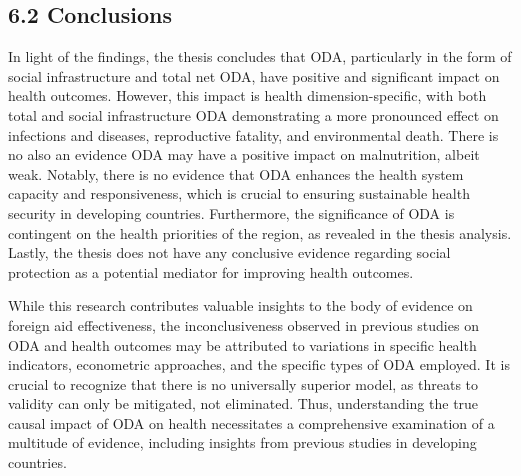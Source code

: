 \subsection*{6.2 Conclusions}

In light of the findings, the thesis concludes that ODA, particularly in the form of social infrastructure and total net ODA, have positive and significant impact on health outcomes. However, this impact is health dimension-specific, with both total and social infrastructure ODA demonstrating a more pronounced effect on infections and diseases, reproductive fatality, and environmental death. There is no also an evidence ODA may have a positive impact on malnutrition, albeit weak. Notably, there is no evidence that ODA enhances the health system capacity and responsiveness, which is crucial to ensuring sustainable health security in developing countries. Furthermore, the significance of ODA is contingent on the health priorities of the region, as revealed in the thesis analysis. Lastly, the thesis does not have any conclusive evidence regarding social protection as a potential mediator for improving health outcomes. 


While this research contributes valuable insights to the body of evidence on foreign aid effectiveness, the inconclusiveness observed in previous studies on ODA and health outcomes may be attributed to variations in specific health indicators, econometric approaches, and the specific types of ODA employed. It is crucial to recognize that there is no universally superior model, as threats to validity can only be mitigated, not eliminated. Thus, understanding the true causal impact of ODA on health necessitates a comprehensive examination of a multitude of evidence, including insights from previous studies in developing countries.

  
 
